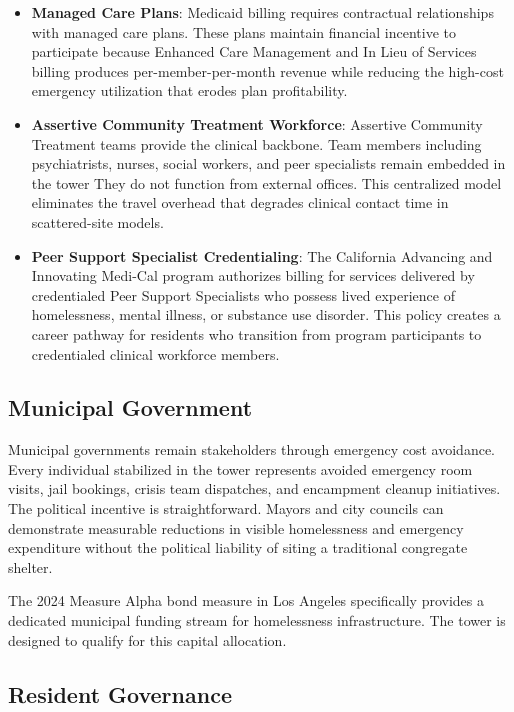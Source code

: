 \documentclass[12pt, letterpaper]{article}
\begin{document}
\begin{itemize}
    \item \textbf{Managed Care Plans}: Medicaid billing requires contractual relationships with managed care plans. These plans maintain financial incentive to participate because Enhanced Care Management and In Lieu of Services billing produces per-member-per-month revenue while reducing the high-cost emergency utilization that erodes plan profitability.
    \item \textbf{Assertive Community Treatment Workforce}: Assertive Community Treatment teams provide the clinical backbone. Team members including psychiatrists, nurses, social workers, and peer specialists remain embedded in the tower They do not function from external offices. This centralized model eliminates the travel overhead that degrades clinical contact time in scattered-site models.
    \item \textbf{Peer Support Specialist Credentialing}: The California Advancing and Innovating Medi-Cal program authorizes billing for services delivered by credentialed Peer Support Specialists who possess lived experience of homelessness, mental illness, or substance use disorder. This policy creates a career pathway for residents who transition from program participants to credentialed clinical workforce members.
\end{itemize}

\subsection{Municipal Government}

Municipal governments remain stakeholders through emergency cost avoidance. Every individual stabilized in the tower represents avoided emergency room visits, jail bookings, crisis team dispatches, and encampment cleanup initiatives. The political incentive is straightforward. Mayors and city councils can demonstrate measurable reductions in visible homelessness and emergency expenditure without the political liability of siting a traditional congregate shelter.

The 2024 Measure Alpha bond measure in Los Angeles specifically provides a dedicated municipal funding stream for homelessness infrastructure. The tower is designed to qualify for this capital allocation.

\subsection{Resident Governance}
\end{document}
